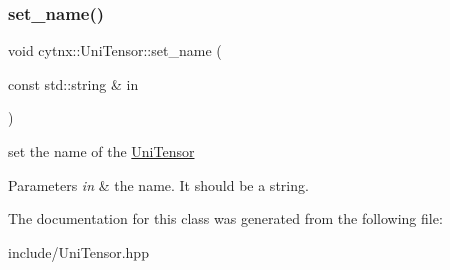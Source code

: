 \subsubsection{\texorpdfstring{set\+\_\+name()}{set\_name()}}
{\footnotesize\ttfamily void cytnx\+::\+Uni\+Tensor\+::set\+\_\+name (\begin{DoxyParamCaption}\item[{const std\+::string \&}]{in }\end{DoxyParamCaption})\hspace{0.3cm}{\ttfamily [inline]}}



set the name of the \hyperlink{classcytnx_1_1UniTensor}{Uni\+Tensor} 


\begin{DoxyParams}{Parameters}
{\em in} & the name. It should be a string. \\
\hline
\end{DoxyParams}


The documentation for this class was generated from the following file\+:\begin{DoxyCompactItemize}
\item 
include/Uni\+Tensor.\+hpp\end{DoxyCompactItemize}
